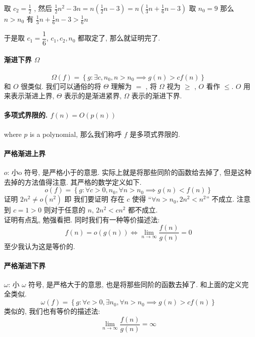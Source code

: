 \documentclass[a4paper, 10pt]{ctexart} %
\begin{document}
取 $c_{2} = \frac{1}{2}$ , 然后 $\displaystyle  \frac{1}{2} n^{2}  - 3n = n \left(\frac{1}{2} n - 3\right) =n \left(\frac{1}{3} n+ \frac{1}{6} n - 3\right)$ 取 $n_{0} = 9$ 那么 $n >n_{0}$ 有 
$\displaystyle  \frac{1}{3} n+ \frac{1}{6} n - 3 > \frac{1}{6} n$

于是取 $c_1 = \dfrac{1}{6}$,  $c_{1} ,c_{2} , n_{0}$ 都取定了, 那么就证明完了.

\paragraph*{渐进下界 $\Omega$} 
\[
\Omega \left(f\right) = \left\{ g: \exists c , n_{0}, n> n_{0} \implies g\left(n\right) > c f\left(n\right)\right\}
\]
和 $O$ 很类似. 我们可以通俗的将 $\Theta$ 理解为 $ = $ , 将 $\Omega$ 视为 $\ge$ , $O$ 看作 $\le$. 
$O$ 用来表示渐进上界, $\Theta$ 表示的是渐进紧界, $\Omega$ 表示的渐进下界.
\paragraph*{多项式界限的. $f\left(n\right) = O\left( p\left(n\right)\right)$} where $p$ is a polynomial, 那么我们称呼 $f$ 是多项式界限的.

\paragraph*{严格渐进上界} $o$: 小o 符号, 是严格小于的意思. 实际上就是将那些同阶的函数给去掉了, 但是这种去掉的方法值得注意. 其严格的数学定义如下.
\[
o \left(f\right) = \left\{ g: \forall  c >  0, n_{0} , \forall n > n_{0} \implies g \left(n\right) < f \left(n\right)\right\}
\]
证明 $2 n^{2} \ne o \left(n^{2}\right)$ 即 我们要证明 存在 $c$ 使得 ``$\forall n > n_{0}, 2 n^{2} < n^{2}$'' 不成立. 注意到 $c = 1 >0 $ 则对于任意的 $n$, $ 2 n^{2} < cn^{2}$ 都不成立.\\
证明有点乱, 勉强看把. 
同时我们有一种等价描述法: 
$$f\left(n \right)   = o \left(g\left(n\right)\right) \iff  \lim_{n \to \infty} \frac{ f\left(n\right)}{g\left(n\right)} =  0$$
至少我认为这是等价的.

\paragraph*{严格渐进下界} $\omega$: 小 $\omega$ 符号, 是严格大于的意思, 也是将那些同阶的函数去掉了. 和上面的定义完全类似.
\[
\omega \left(f\right) = \left\{ g:\forall c > 0 , \exists n_{0} , \forall  n > n_{0} \implies g \left(n \right) > cf \left(n\right)\right\}
\]
类似的, 我们也有等价的描述法: 
$$ \lim_{n \to \infty} \frac{f\left(n\right)}{g\left(n\right)} = \infty$$
\end{document}
